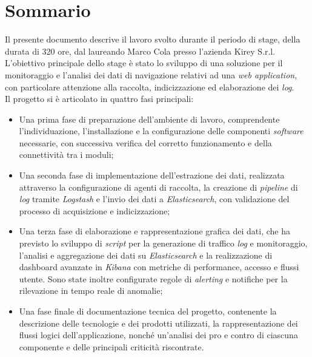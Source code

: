 \cleardoublepage
{}
{}
\begingroup
\let\clearpage\relax
\let\cleardoublepage\relax
\let\cleardoublepage\relax

\chapter*{Sommario}

Il presente documento descrive il lavoro svolto durante il periodo di stage, della durata di 320 ore, dal laureando Marco Cola presso l'azienda Kirey S.r.l. \\
L'obiettivo principale dello stage è stato lo sviluppo di una soluzione per il monitoraggio e l'analisi dei dati di navigazione relativi ad una \emph{web application}, con particolare attenzione alla raccolta, indicizzazione ed elaborazione dei \emph{log}. \\
Il progetto si è articolato in quattro fasi principali:

\begin{itemize}
    \item Una prima fase di preparazione dell'ambiente di lavoro, comprendente l'individuazione, l'installazione e la configurazione delle componenti \emph{software} necessarie, con successiva verifica del corretto funzionamento e della connettività tra i moduli;
    \item Una seconda fase di implementazione dell'estrazione dei dati, realizzata attraverso la configurazione di agenti di raccolta, la creazione di \emph{pipeline} di \emph{log} tramite \emph{Logstash} e l'invio dei dati a \emph{Elasticsearch}, con validazione del processo di acquisizione e indicizzazione;
    \item Una terza fase di elaborazione e rappresentazione grafica dei dati, che ha previsto lo sviluppo di \emph{script} per la generazione di traffico \emph{log} e monitoraggio, l'analisi e aggregazione dei dati su \emph{Elasticsearch} e la realizzazione di dashboard avanzate in \emph{Kibana} con metriche di performance, accesso e flussi utente. Sono state inoltre configurate regole di \emph{alerting} e notifiche per la rilevazione in tempo reale di anomalie;
    \item Una fase finale di documentazione tecnica del progetto, contenente la descrizione delle tecnologie e dei prodotti utilizzati, la rappresentazione dei flussi logici dell'applicazione, nonché un'analisi dei pro e contro di ciascuna componente e delle principali criticità riscontrate.
\end{itemize}

